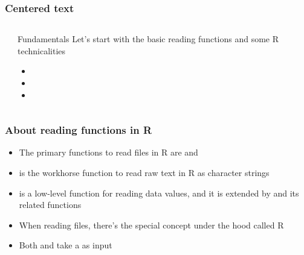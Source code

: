 \documentclass{beamer}
\begin{document}

\begin{frame}
\frametitle{Centered text}

\begin{columns}[t]
\begin{column}{0.2\textwidth}
\end{column}
\begin{column}{0.6\textwidth}

\begin{block}{Fundamentals}
Let's start with the basic reading functions and some R technicalities
 \begin{itemize}
  \item {}
  \item {}
  \item {}
 \end{itemize}
\end{block}

\end{column}
\begin{column}{0.1\textwidth}
\end{column}
\end{columns}

\end{frame}


\begin{frame}
\frametitle{About reading functions in R}

\begin{itemize}
 \item The primary functions to read files in R are  and 

 \item {} is the workhorse function to read raw text in R as character strings

 \item {} is a low-level function for reading data values, and it is extended by  and its related functions

 \item When reading files, there's the special concept under the hood called R 

 \item Both  and  take a  as input
\end{itemize}

\end{frame}
\end{document}
